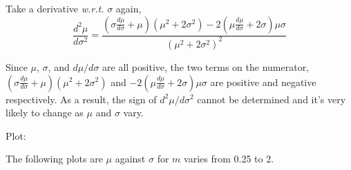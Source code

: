\documentclass[a4paper]{article}
\begin{document}
Take a derivative \textit{w.r.t.} $\sigma$ again,
\[\frac{d^2\mu}{d\sigma^2}=\frac{(\sigma\frac{d\mu}{d\sigma}+\mu)(\mu^2+2\sigma^2)-2(\mu\frac{d\mu}{d\sigma}+2\sigma)\mu\sigma}{(\mu^2+2\sigma^2)^2}\]

Since $\mu$, $\sigma$, and $d\mu/d\sigma$ are all positive, the two terms on the numerator, $(\sigma\frac{d\mu}{d\sigma}+\mu)(\mu^2+2\sigma^2)$ and $-2(\mu\frac{d\mu}{d\sigma}+2\sigma)\mu\sigma$ are positive and negative respectively. As a result, the sign of $d^2\mu/d\sigma^2$ cannot be determined and it's very likely to change as $\mu$ and $\sigma$ vary.\newline

Plot:\newline

The following plots are $\mu$ against $\sigma$ for $m$ varies from 0.25 to 2.\newline
\end{document}
